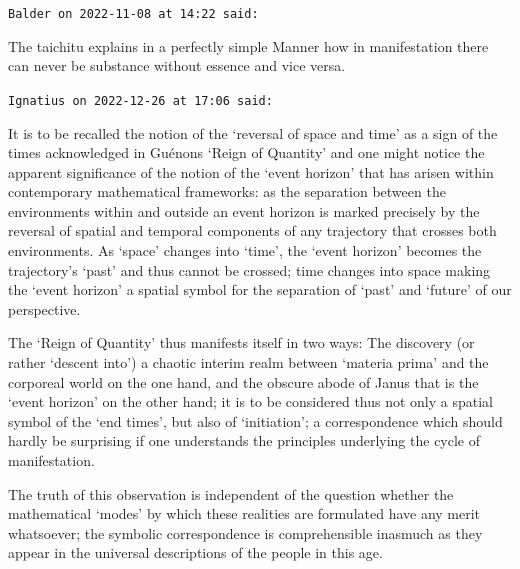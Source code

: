 \begin{footnotesize}
\begin{sffamily}
\hfill

\texttt{Balder on 2022-11-08 at 14:22 said: }

The taichitu explains in a perfectly simple Manner how in manifestation there can never be substance without essence and vice versa.

\hfill

\texttt{Ignatius on 2022-12-26 at 17:06 said: }

It is to be recalled the notion of the `reversal of space and time' as a sign of the times acknowledged in Guénons `Reign of Quantity' and one might notice the apparent significance of the notion of the `event horizon' that has arisen within contemporary mathematical frameworks: as the separation between the environments within and outside an event horizon is marked precisely by the reversal of spatial and temporal components of any trajectory that crosses both environments. As `space' changes into `time', the `event horizon' becomes the trajectory’s `past' and thus cannot be crossed; time changes into space making the `event horizon' a spatial symbol for the separation of `past' and `future' of our perspective. 

The `Reign of Quantity' thus manifests itself in two ways: The discovery (or rather `descent into') a chaotic interim realm between `materia prima' and the corporeal world on the one hand, and the obscure abode of Janus that is the `event horizon' on the other hand; it is to be considered thus not only a spatial symbol of the `end times', but also of `initiation'; a correspondence which should hardly be surprising if one understands the principles underlying the cycle of manifestation.

The truth of this observation is independent of the question whether the mathematical `modes' by which these realities are formulated have any merit whatsoever; the symbolic correspondence is comprehensible inasmuch as they appear in the universal descriptions of the people in this age.

\end{sffamily}\end{footnotesize}